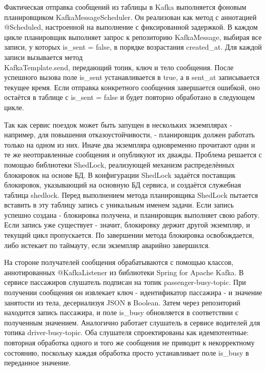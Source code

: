{  \par \redline Фактическая отправка сообщений из таблицы в Kafka выполняется фоновым планировщиком KafkaMessageScheduler. Он реализован как метод с аннотацией @Scheduled, настроенной на выполнение с фиксированной задержкой. В каждом цикле планировщик выполняет запрос к репозиторию KafkaMessage, выбирая все записи, у которых is\_sent = false, в порядке возрастания created\_at. Для каждой записи вызывается метод \\KafkaTemplate.send, передающий топик, ключ и тело сообщения. После успешного вызова поле is\_sent устанавливается в true, а в sent\_at записывается текущее время. Если отправка конкретного сообщения завершается ошибкой, оно остаётся в таблице с is\_sent = false и будет повторно обработано в следующем цикле.

  \par \redline Так как сервис поездок может быть запущен в нескольких экземплярах - например, для повышения отказоустойчивости, - планировщик должен работать только на одном из них. Иначе два экземпляра одновременно прочитают одни и те же неотправленные сообщения и опубликуют их дважды. Проблема решается с помощью библиотеки ShedLock, реализующей механизм распределённых блокировок на основе БД. В конфигурации ShedLock задаётся поставщик блокировок, указывающий на основную БД сервиса, и создаётся служебная таблица shedlock. Перед выполнением метода планировщика ShedLock пытается вставить в эту таблицу запись с уникальным именем задачи. Если запись успешно создана - блокировка получена, и планировщик выполняет свою работу. Если запись уже существует - значит, блокировку держит другой экземпляр, и текущий цикл пропускается. По завершении метода блокировка освобождается, либо истекает по таймауту, если экземпляр аварийно завершился.

  \par \redline На стороне получателей сообщения обрабатываются с помощью классов, аннотированных @KafkaListener из библиотеки Spring for Apache Kafka. В сервисе пассажиров слушатель подписан на топик passenger-busy-topic. При получении сообщения он извлекает ключ - идентификатор пассажира - и значение занятости из тела, десериализуя JSON в Boolean. Затем через репозиторий находится запись пассажира, и поле is\_busy обновляется в соответствии с полученным значением. Аналогично работает слушатель в сервисе водителей для топика driver-busy-topic. Оба слушателя спроектированы как идемпотентные: повторная обработка одного и того же сообщения не приводит к некорректному состоянию, поскольку каждая обработка просто устанавливает поле is\_busy в переданное значение.

}
